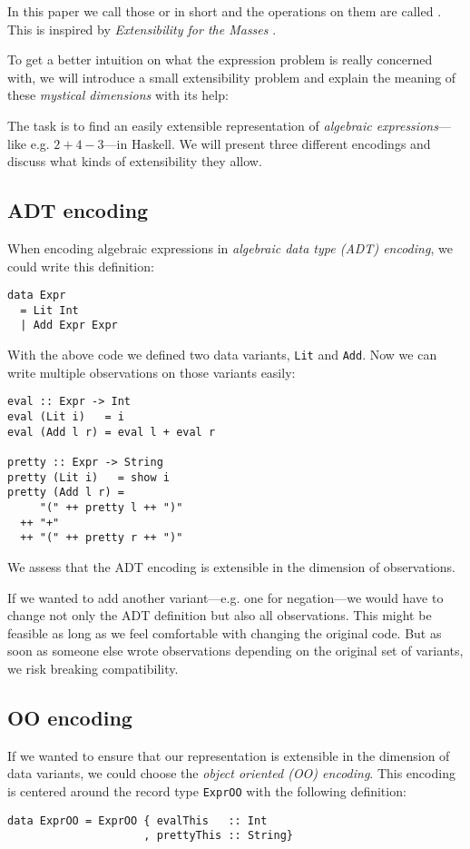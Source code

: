 In this paper we call those   or in short
 and the operations on them are called . This is
inspired by \emph{Extensibility for the Masses} \cite{object_algebra}.

To get a better intuition on what the expression problem is really concerned
with, we will introduce a small extensibility problem and explain the meaning of
these \emph{mystical dimensions} with its help:

The task is to find an easily extensible representation of \emph{algebraic
  expressions}—like e.g. $2+4-3$—in Haskell. We will present three different
encodings and discuss what kinds of extensibility they allow.

\subsection{ADT encoding}

When encoding algebraic expressions in \emph{algebraic data type (ADT)
  encoding}, we could write this definition:

\begin{lstlisting}
data Expr
  = Lit Int
  | Add Expr Expr
\end{lstlisting}

With the above code we defined two data variants, \texttt{Lit} and
\texttt{Add}. Now we can write multiple observations on those variants
easily:

\begin{lstlisting} 
eval :: Expr -> Int
eval (Lit i)   = i
eval (Add l r) = eval l + eval r

pretty :: Expr -> String
pretty (Lit i)   = show i
pretty (Add l r) =
     "(" ++ pretty l ++ ")"
  ++ "+"
  ++ "(" ++ pretty r ++ ")"
\end{lstlisting}

We assess that the ADT encoding is extensible in the dimension of observations.

If we wanted to add another variant—e.g. one for negation—we would have to
change not only the ADT definition but also all observations. This might be
feasible as long as we feel comfortable with changing the original code. But as
soon as someone else wrote observations depending on the original set of
variants, we risk breaking compatibility.

\subsection{OO encoding}
If we wanted to ensure that our representation is extensible in the dimension of
data variants, we could choose the \emph{object oriented (OO) encoding}. This
encoding is centered around the record type \texttt{ExprOO} with the following
definition:
\begin{lstlisting}
data ExprOO = ExprOO { evalThis   :: Int
                     , prettyThis :: String}
\end{lstlisting}

